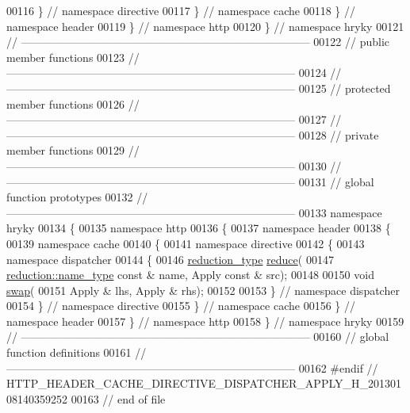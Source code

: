 \begin{DoxyCode}
00116 \} \textcolor{comment}{// namespace directive}
00117 \} \textcolor{comment}{// namespace cache}
00118 \} \textcolor{comment}{// namespace header}
00119 \} \textcolor{comment}{// namespace http}
00120 \} \textcolor{comment}{// namespace hryky}
00121 \textcolor{comment}{//
      ------------------------------------------------------------------------------}
00122 \textcolor{comment}{// public member functions}
00123 \textcolor{comment}{//
      ------------------------------------------------------------------------------}
00124 \textcolor{comment}{//
      ------------------------------------------------------------------------------}
00125 \textcolor{comment}{// protected member functions}
00126 \textcolor{comment}{//
      ------------------------------------------------------------------------------}
00127 \textcolor{comment}{//
      ------------------------------------------------------------------------------}
00128 \textcolor{comment}{// private member functions}
00129 \textcolor{comment}{//
      ------------------------------------------------------------------------------}
00130 \textcolor{comment}{//
      ------------------------------------------------------------------------------}
00131 \textcolor{comment}{// global function prototypes}
00132 \textcolor{comment}{//
      ------------------------------------------------------------------------------}
00133 \textcolor{keyword}{namespace }hryky
00134 \{
00135 \textcolor{keyword}{namespace }http
00136 \{
00137 \textcolor{keyword}{namespace }header
00138 \{
00139 \textcolor{keyword}{namespace }cache
00140 \{
00141 \textcolor{keyword}{namespace }directive
00142 \{
00143 \textcolor{keyword}{namespace }dispatcher
00144 \{
00146     \hyperlink{namespacehryky_a343a9a4c36a586be5c2693156200eadc}{reduction_type} \hyperlink{namespacehryky_1_1http_a08fc36a78a8e2908140fcd102829a566}{reduce}(
00147         \hyperlink{namespacehryky_1_1reduction_ac686c30a4c8d196bbd0f05629a6b921f}{reduction::name_type} \textcolor{keyword}{const} & name, Apply \textcolor{keyword}{const} & src);
00148 
00150     \textcolor{keywordtype}{void} \hyperlink{namespacehryky_1_1http_a38e62595ad532d18fbc65ceb61973aec}{swap}(
00151         Apply & lhs, Apply & rhs);
00152 
00153 \} \textcolor{comment}{// namespace dispatcher}
00154 \} \textcolor{comment}{// namespace directive}
00155 \} \textcolor{comment}{// namespace cache}
00156 \} \textcolor{comment}{// namespace header}
00157 \} \textcolor{comment}{// namespace http}
00158 \} \textcolor{comment}{// namespace hryky}
00159 \textcolor{comment}{//
      ------------------------------------------------------------------------------}
00160 \textcolor{comment}{// global function definitions}
00161 \textcolor{comment}{//
      ------------------------------------------------------------------------------}
00162 \textcolor{preprocessor}{#endif // HTTP\_HEADER\_CACHE\_DIRECTIVE\_DISPATCHER\_APPLY\_H\_20130108140359252}
00163 \textcolor{preprocessor}{}\textcolor{comment}{// end of file}
\end{DoxyCode}
